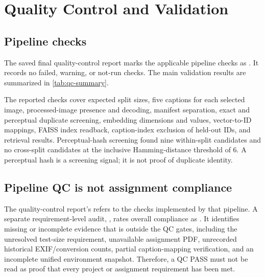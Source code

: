 \chapter{Quality Control and Validation}
\label{ch:quality}

\section{Pipeline checks}
The saved final quality-control report marks the applicable pipeline checks as \pass. It records no failed, warning, or not-run checks. The main validation results are summarized in \cref{tab:qc-summary}.



The reported checks cover expected split sizes, five captions for each selected image, processed-image presence and decoding, manifest separation, exact and perceptual duplicate screening, embedding dimensions and values, vector-to-ID mappings, FAISS index readback, caption-index exclusion of held-out IDs, and retrieval results. Perceptual-hash screening found nine within-split candidates and no cross-split candidates at the inclusive Hamming-distance threshold of 6. A perceptual hash is a screening signal; it is not proof of duplicate identity.

\section{Pipeline QC is not assignment compliance}
The quality-control report's  refers to the checks implemented by that pipeline. A separate requirement-level audit, , rates overall compliance as \partialstatus. It identifies missing or incomplete evidence that is outside the QC gates, including the unresolved test-size requirement, unavailable assignment PDF, unrecorded historical EXIF/conversion counts, partial caption-mapping verification, and an incomplete unified environment snapshot. Therefore, a QC PASS must not be read as proof that every project or assignment requirement has been met.
